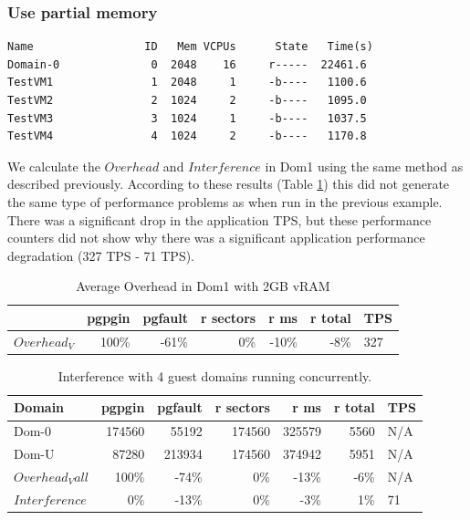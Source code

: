 \subsubsection{Use partial memory}
\begin{Verbatim}
Name                 ID   Mem VCPUs      State   Time(s)
Domain-0              0  2048    16     r-----  22461.6
TestVM1               1  2048     1     -b----   1100.6
TestVM2               2  1024     2     -b----   1095.0
TestVM3               3  1024     1     -b----   1037.5
TestVM4               4  1024     2     -b----   1170.8
\end{Verbatim}

We calculate the $Overhead$ and $Interference$ in Dom1 using the same method as described previously. 
According to these results (Table \ref{tab:IntMedA}) this did not generate the same type of performance problems as when run in the previous example.  
There was a significant drop in the application TPS, but these performance counters did not show why there was a significant application performance degradation (327 TPS - 71 TPS).

\begin{table}[h]
\begin{tabular}{ l r r r r r p{5cm} }
	         & pgpgin & pgfault & r sectors & r ms	& r total & TPS \\
	\hline
	$Overhead_V$ & 100\%  & -61\%	 &      0\%	 & -10\% &    -8\% &  327 \\
\end{tabular}
\caption{Average Overhead in Dom1 with 2GB vRAM}
\end{table}

\begin{table}[h]
\begin{tabular}{ l r r r r r p{5cm} }
	Domain  & pgpgin & pgfault & r sectors & r ms	& r total & TPS \\
	\hline
	Dom-0	& 174560 &	55192 &	174560 &	325579 &	5560 & N/A \\
    Dom-U	& 87280	 & 213934 & 174560 &    374942 &    5951 & N/A \\
	$Overhead_Vall$ & 100\%  &   -74\%&  0\%   &    -13\% &    -6\%  & N/A \\
    $Interference$ & 0\% & -13\% & 0\%   &     -3\% &     1\%  & 71 \\
\end{tabular}
\caption{Interference with 4 guest domains running concurrently.}
\label{tab:IntMedA}
\end{table}

